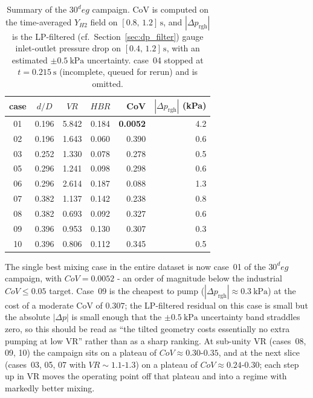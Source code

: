 \documentclass[11pt,a4paper]{article}
\def\Hi{H2}%
\def\dD{d/D}%
\def\VR{VR}%
\def\HBR{HBR}%
\def\CoV{CoV}%
\def\circ{ deg}%
\newcommand{\Hi}{\ensuremath{\mathrm{H_2}}}
\newcommand{\dD}{\ensuremath{d/D}}
\newcommand{\VR}{\ensuremath{\mathrm{VR}}}
\newcommand{\HBR}{\ensuremath{\mathrm{HBR}}}
\newcommand{\CoV}{\ensuremath{\mathrm{CoV}}}
\begin{document}
\begin{table}[H]
\centering
\small
\caption{Summary of the \(30^\circ\) campaign. \CoV{} is computed
on the time-averaged \(Y_{\Hi}\) field on
\([0.8,\,1.2]\,\si{\second}\), and
\(|\Delta p_{\mathrm{rgh}}|\) is the LP-filtered (cf.\
Section~\ref{sec:dp_filter}) gauge inlet-outlet pressure drop on
\([0.4,\,1.2]\,\si{\second}\), with an estimated
\(\pm\SI{0.5}{\kilo\pascal}\) uncertainty. case~04 stopped at
\(t=\SI{0.215}{\second}\) (incomplete, queued for rerun) and is
omitted.}
\label{tab:30deg_summary}
\begin{tabular}{ccccrr}
\toprule
case & \(\dD\) & \(\VR\) & \(\HBR\) & \CoV{} & \(|\Delta p_{\mathrm{rgh}}|\) (kPa) \\
\midrule
01 & 0.196 & 5.842 & 0.184 & \textbf{0.0052} & 4.2 \\
02 & 0.196 & 1.643 & 0.060 & 0.390 & 0.6 \\
03 & 0.252 & 1.330 & 0.078 & 0.278 & 0.5 \\
05 & 0.296 & 1.241 & 0.098 & 0.298 & 0.6 \\
06 & 0.296 & 2.614 & 0.187 & 0.088 & 1.3 \\
07 & 0.382 & 1.137 & 0.142 & 0.238 & 0.8 \\
08 & 0.382 & 0.693 & 0.092 & 0.327 & 0.6 \\
09 & 0.396 & 0.953 & 0.130 & 0.307 & 0.3 \\
10 & 0.396 & 0.806 & 0.112 & 0.345 & 0.5 \\
\bottomrule
\end{tabular}
\end{table}

The single best mixing case in the entire dataset is now case~01 of
the \(30^\circ\) campaign, with \(\CoV = 0.0052\) - an order of
magnitude below the industrial \(\CoV \le 0.05\) target. Case~09
is the cheapest to pump (\(|\Delta p_{\mathrm{rgh}}| \approx
\SI{0.3}{\kilo\pascal}\)) at the cost of a moderate \CoV{} of
\(0.307\); the LP-filtered residual on this case is small but the
absolute \(|\Delta p|\) is small enough that the
\(\pm\SI{0.5}{\kilo\pascal}\) uncertainty band straddles zero, so
this should be read as ``the tilted geometry costs essentially no
extra pumping at low \VR{}'' rather than as a sharp ranking.
At sub-unity \VR{} (cases~08, 09, 10) the campaign sits on a
plateau of \(\CoV \approx 0.30\)-\(0.35\), and at the next slice
(cases~03, 05, 07 with \(\VR\sim 1.1\)-\(1.3\)) on a plateau of
\(\CoV \approx 0.24\)-\(0.30\); each step up in \VR{} moves the
operating point off that plateau and into a regime with markedly
better mixing.
\end{document}
